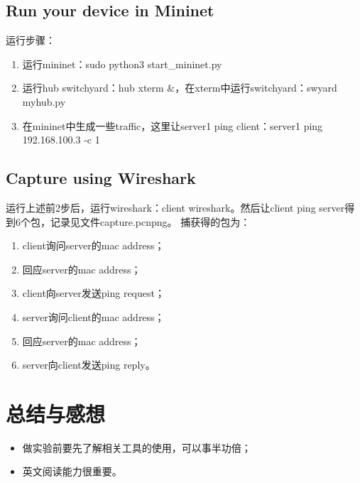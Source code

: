 \documentclass[12pt,a4paper,UTF8]{article}
\begin{document}
\newpage
\subsection{Run your device in Mininet}
运行步骤：
\begin{enumerate}
	\item 运行mininet：sudo python3 start\_mininet.py
	\item 运行hub switchyard：hub xterm \&，在xterm中运行switchyard：swyard myhub.py
	\item 在mininet中生成一些traffic，这里让server1 ping client：server1 ping 192.168.100.3 -c 1
\end{enumerate}

\subsection{Capture using Wireshark}
运行上述前2步后，运行wireshark：client wireshark。然后让client ping server得到6个包，记录见文件capture.pcnpng。
捕获得的包为：
\begin{enumerate}
	\item client询问server的mac address；
	\item 回应server的mac address；
	\item client向server发送ping request；
	\item server询问client的mac address；
	\item 回应server的mac address；
	\item server向client发送ping reply。
\end{enumerate}

\section{总结与感想}
\begin{itemize}
	\item 做实验前要先了解相关工具的使用，可以事半功倍；
	\item 英文阅读能力很重要。
\end{itemize}
\end{document}
